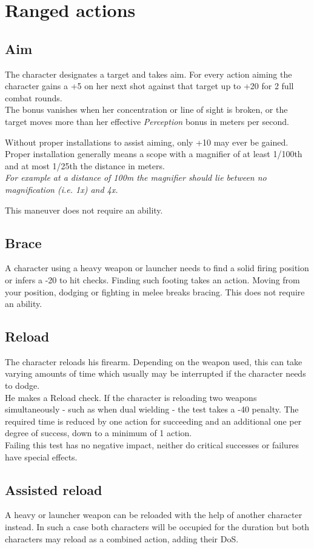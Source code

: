 \section{Ranged actions}
\subsection*{Aim}
The character designates a target and takes aim. For every action aiming the character gains a +5 on her next shot against that target up to +20 for 2 full combat rounds.\\
The bonus vanishes when her concentration or line of sight is broken, or the target moves more than her effective \emph{Perception} bonus in meters per second.
\par
Without proper installations to assist aiming, only +10 may ever be gained. Proper installation generally means a scope with a magnifier of at least 1/100th and at most 1/25th the distance in meters.\\
\textit{For example at a distance of 100m the magnifier should lie between no magnification (i.e. 1x) and 4x.}
\par
This maneuver does not require an ability.
\subsection*{Brace}
A character using a heavy weapon or launcher needs to find a solid firing position or infers a -20 to hit checks. Finding such footing takes an action. Moving from your position, dodging or fighting in melee breaks bracing. This does not require an ability.
\subsection*{Reload}
The character reloads his firearm. Depending on the weapon used, this can take varying amounts of time which usually may be interrupted if the character needs to dodge.\\
He makes a Reload check. If the character is reloading two weapons simultaneously - such as when dual wielding - the test takes a -40 penalty.
The required time is reduced by one action for succeeding and an additional one per degree of success, down to a minimum of 1 action.\\
Failing this test has no negative impact, neither do critical successes or failures have special effects.
\subsection*{Assisted reload}
A heavy or launcher weapon can be reloaded with the help of another character instead. In such a case both characters will be occupied for the duration but both characters may reload as a combined action, adding their DoS.

